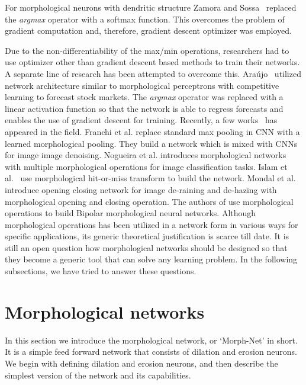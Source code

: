 \documentclass[12pt]{article}
\begin{document}
For morphological neurons with dendritic structure Zamora and Sossa~\cite{zamora_dendrite_2017} replaced the \emph{argmax} operator with a softmax function. This overcomes the problem of gradient computation and, therefore, gradient descent optimizer was employed. 

Due to the non-differentiability of the max/min operations, researchers had to use optimizer other than gradient descent based methods to train their networks. A separate line of research has been attempted to overcome this. 
Ara\'{u}jo~\cite{de_a_araujo_morphological_2012} utilized network architecture similar to morphological perceptrons with competitive learning to forecast stock markets. The \emph{argmax} operator was replaced with a linear activation function so that the network is able to regress forecasts and enables the use of gradient descent for training. Recently, a few works~\cite{aminul2019deep,franchi2020deep,nogueira2019introduction} has appeared in the field. Franchi et al.\cite{franchi2020deep} replace standard max pooling in CNN with a learned morphological pooling. They build a network which is mixed with CNNs for image image denoising. Nogueira et al.\cite{nogueira2019introduction}  introduces morphological networks with multiple morphological operations for image classification tasks. Islam et al.~\cite{aminul2019deep} use morphological hit-or-miss transform to build the network. Mondal et al.~\cite{mondal2020image} introduce opening closing network for image de-raining and de-hazing with morphological opening and closing operation. The authors of \cite{limonova2020bipolar} use morphological operations to build Bipolar morphological neural networks.
Although morphological operations has been utilized in a network form in various ways for specific applications, its generic theoretical justification is scarce till date. It is still an open question how morphological networks should be designed so that they become a generic tool that can solve any learning problem.
In the following subsections, we have tried to answer these questions. 

\section{Morphological networks}
\label{sec:morph_net} 
In this section we introduce the morphological network, or `Morph-Net' in short. It is a simple feed forward network that consists of dilation and erosion neurons. 
We begin with defining dilation and erosion neurons, and then describe the simplest version of the network and its capabilities. 
\end{document}
